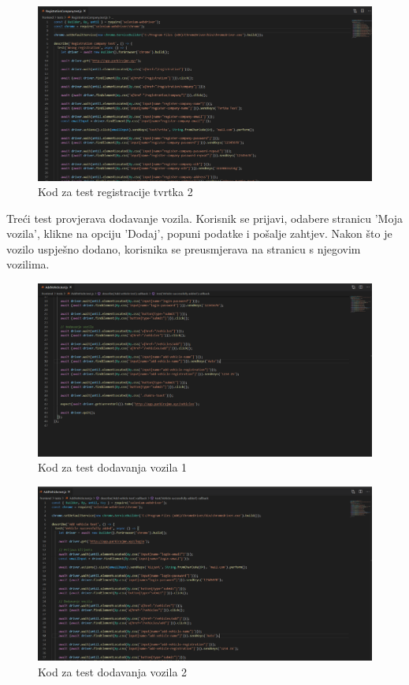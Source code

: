 			
			\begin{figure}[H]
				\includegraphics[width=1\linewidth]{images/RegistrationCompany2.png}
				\caption{Kod za test registracije tvrtka 2}
				\label{fig:RegistrationCompany test - kod2} 
			\end{figure}
			
			
			Treći test provjerava dodavanje vozila. Korisnik se prijavi, odabere stranicu 'Moja vozila', klikne na opciju 'Dodaj', popuni podatke i pošalje zahtjev. Nakon što je vozilo uspješno dodano, korisnika se preusmjerava na stranicu s njegovim vozilima.
						
		\begin{figure}[H]
			\includegraphics[width=1\linewidth]{images/AddVehicle1.png}
			\caption{Kod za test dodavanja vozila 1}
			\label{fig:AddVehicle test - kod 1} 
		\end{figure}
	
	\begin{figure}[H]
		\includegraphics[width=1\linewidth]{images/AddVehicle2.png}
		\caption{Kod za test dodavanja vozila 2}
		\label{fig:AddVehicle test - kod 2} 
	\end{figure}

